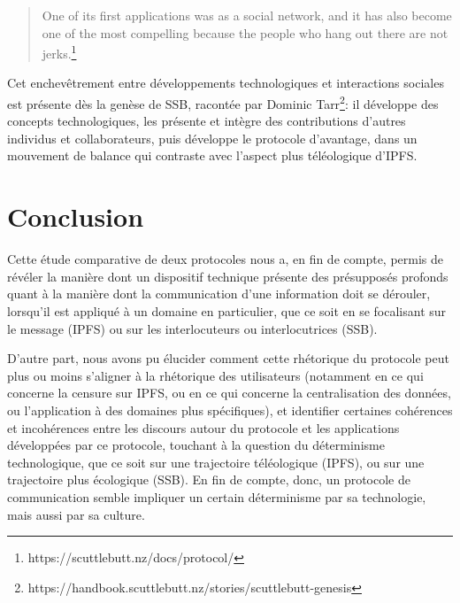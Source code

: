 \documentclass{article}
\begin{document}
\begin{quote}
    One of its first applications was as a social network, and it has also become one of the most compelling because the people who hang out there are not jerks.\footnote{https://scuttlebutt.nz/docs/protocol/}
\end{quote}

Cet enchevêtrement entre développements technologiques et interactions sociales est présente dès la genèse de SSB, racontée par Dominic Tarr\footnote{https://handbook.scuttlebutt.nz/stories/scuttlebutt-genesis}: il développe des concepts technologiques, les présente et intègre des contributions d'autres individus et collaborateurs, puis développe le protocole d'avantage, dans un mouvement de balance qui contraste avec l'aspect plus téléologique d'IPFS.

\section{Conclusion}

Cette étude comparative de deux protocoles nous a, en fin de compte, permis de révéler la manière dont un dispositif technique présente des présupposés profonds quant à la manière dont la communication d'une information doit se dérouler, lorsqu'il est appliqué à un domaine en particulier, que ce soit en se focalisant sur le message (IPFS) ou sur les interlocuteurs ou interlocutrices (SSB).

D'autre part, nous avons pu élucider comment cette rhétorique du protocole peut plus ou moins s'aligner à la rhétorique des utilisateurs (notamment en ce qui concerne la censure sur IPFS, ou en ce qui concerne la centralisation des données, ou l'application à des domaines plus spécifiques), et identifier certaines cohérences et incohérences entre les discours autour du protocole et les applications développées par ce protocole, touchant à la question du déterminisme technologique, que ce soit sur une trajectoire téléologique (IPFS), ou sur une trajectoire plus écologique (SSB). En fin de compte, donc, un protocole de communication semble impliquer un certain déterminisme par sa technologie, mais aussi par sa culture.

\pagebreak



\end{document}
